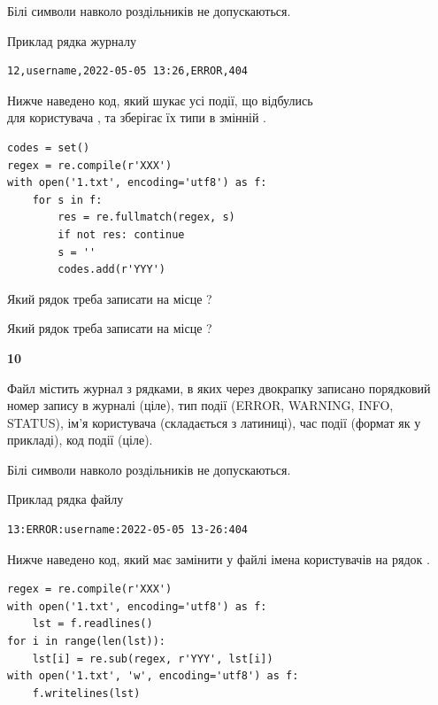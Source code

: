 Білі символи навколо роздільників не допускаються.

Приклад рядка журналу



\begin{verbatim}
12,username,2022-05-05 13:26,ERROR,404
\end{verbatim}


Нижче наведено код, який шукає усі події, що відбулись\\ для користувача , та зберігає їх типи в змінній .



\begin{verbatim}
codes = set()
regex = re.compile(r'XXX')
with open('1.txt', encoding='utf8') as f:
    for s in f:
        res = re.fullmatch(regex, s)
        if not res: continue
        s = ''
        codes.add(r'YYY')
\end{verbatim}





Який рядок треба записати на місце  ?\par
\vspace{5mm}


Який рядок треба записати на місце  ?\par


\newpage

{\begin {center}\textbf{ 10}\end {center}}\par
Файл  містить журнал з рядками, в яких через двокрапку записано поряд\-ко\-вий номер запису в журналі (ціле), тип події (ERROR, WARNING, INFO, STATUS), ім'я користувача (складається з латиниці), час події (фор\-мат як у прикладі), код події (ціле).

Білі символи навколо роздільників не допускаються.

Приклад рядка файлу



\begin{verbatim}
13:ERROR:username:2022-05-05 13-26:404
\end{verbatim}


Нижче наведено код, який має замінити у файлі імена користувачів на рядок .



\begin{verbatim}
regex = re.compile(r'XXX')
with open('1.txt', encoding='utf8') as f:
    lst = f.readlines()
for i in range(len(lst)):
    lst[i] = re.sub(regex, r'YYY', lst[i])
with open('1.txt', 'w', encoding='utf8') as f:
    f.writelines(lst)
\end{verbatim}







